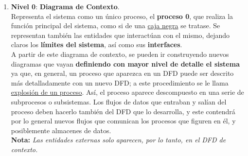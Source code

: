 \begin{enumerate}
    \item \textbf{Nivel 0}: \textbf{Diagrama de Contexto}.\\
          Representa el sistema como un único proceso, el \textbf{proceso 0}, que realiza la función principal del sistema, como si de una \uline{caja negra} se tratase. Se representan también las entidades que interactúan con el mismo, dejando claros los \textbf{límites del sistema}, así como sus \textbf{interfaces}.\\
          
          A partir de este diagrama de contexto, se pueden ir construyendo nuevos diagramas que vayan \textbf{definiendo con mayor nivel de detalle el sistema} ya que, en general, un proceso que aparezca en un DFD puede ser descrito más detalladamente con un nuevo DFD; a este procedimiento se le llama \uline{explosión de un proceso}. Así, el proceso aparece descompuesto en una serie de subprocesos o subsistemas. Los flujos de datos que entraban y salían del proceso deben hacerlo también del DFD que lo desarrolla, y este contendrá por lo general nuevos flujos que comunican los procesos que figuren en él, y posiblemente almacenes de datos.\\

          \textbf{Nota:} \textit{Las entidades externas solo aparecen, por lo tanto, en el DFD de contexto.}


\end{enumerate}

